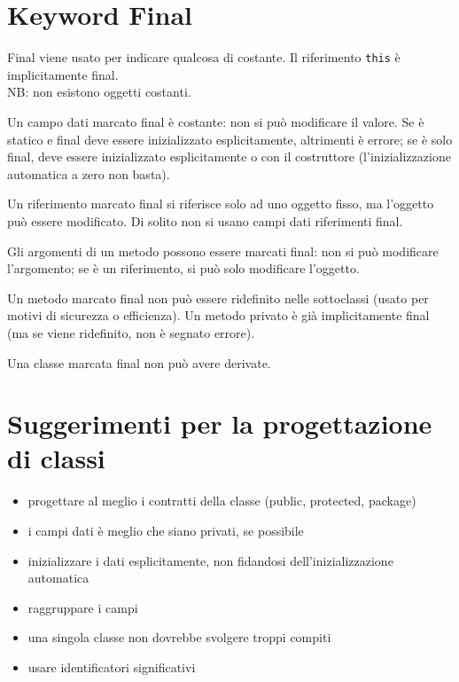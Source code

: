 \section{Keyword Final} %
Final viene usato per indicare qualcosa di costante. Il riferimento \texttt{this} è implicitamente final. \\
NB: non esistono oggetti costanti.

Un campo dati marcato final è costante: non si può modificare il valore. Se è  statico e final deve essere inizializzato esplicitamente, altrimenti è errore; se è solo final, deve essere inizializzato esplicitamente o con il costruttore (l'inizializzazione automatica a zero non basta).

Un riferimento marcato final si riferisce solo ad uno oggetto fisso, ma l'oggetto può essere modificato. Di solito non si usano campi dati riferimenti final.

Gli argomenti di un metodo possono essere marcati final: non si può modificare l'argomento; se è un riferimento, si può solo modificare l'oggetto.

Un metodo marcato final non può essere ridefinito nelle sottoclassi (usato per motivi di sicurezza o efficienza). Un metodo privato è già implicitamente final (ma se viene ridefinito, non è segnato errore).

Una classe marcata final non può avere derivate.

\section{Suggerimenti per la progettazione di classi} %
\begin{itemize}
\item progettare al meglio i contratti della classe (public, protected, package)
\item i campi dati è meglio che siano privati, se possibile
\item inizializzare i dati esplicitamente, non fidandosi dell'inizializzazione automatica
\item raggruppare i campi
\item una singola classe non dovrebbe svolgere troppi compiti
\item usare identificatori significativi
\end{itemize}

